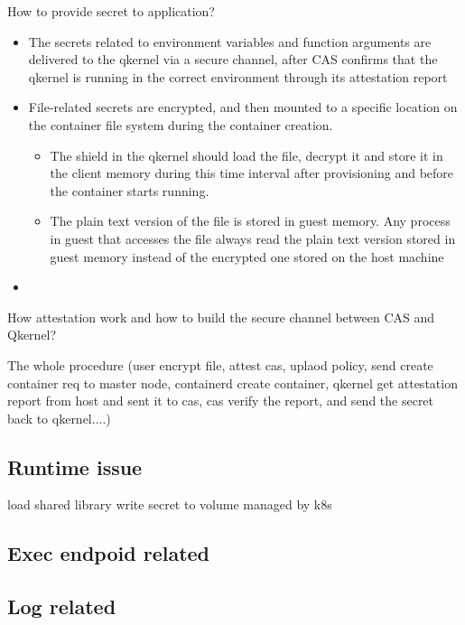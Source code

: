 How to provide secret to application?
\begin{itemize}
    \item  The secrets related to environment variables and function arguments are  delivered to the qkernel via a secure channel, after CAS confirms that the qkernel is running in the correct environment through its attestation report
    \item  File-related secrets are encrypted, and then mounted to a specific location on the container file system  during the container creation.
    \begin{itemize}
        \item The shield in the qkernel should load the file, decrypt it and store it in the client memory during this time interval after provisioning and before the container starts running.
        \item The plain text version of the file is stored in guest memory. Any process in guest that accesses the file always read the plain text version stored in guest memory instead of the encrypted one stored on the host machine
      \end{itemize}
    \item
\end{itemize}

How attestation work and how to build the secure channel between CAS and Qkernel?


The whole procedure (user encrypt file, attest cas, uplaod policy, send create container req to master node, containerd create container, qkernel get attestation report from host and sent it to cas, cas verify the report, and send the secret back to qkernel....)


\subsection{Runtime issue}
load shared library
write secret to volume managed by k8s


\subsection{Exec endpoid related}


\subsection{Log related}




\cleardoublepage

